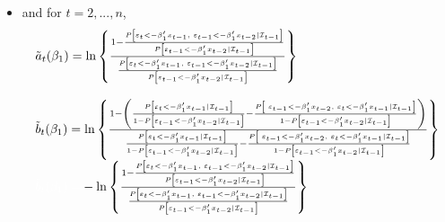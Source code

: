\documentclass{beamer}
\begin{document}
\begin{frame}
\begin{itemize}
\item{} and for $t=2,...,n$,%
\begin{equation*}
\begin{tabular}{l}
$\tilde{a}_{t}(\beta _{1})=\ln \left\{ \frac{1-\frac{P\left[
\varepsilon_{t}<-\beta_1'x_{t-1},\text{ }\varepsilon_{t-1}<-\beta _{1}'
x_{t-2}\mid\mathcal{I}_{t-1}\right] }{P\left[ \varepsilon_{t-1}<-\beta _{1}'
x_{t-2}\mid\mathcal{I}_{t-1}\right] }}{\frac{P\left[ \varepsilon_{t}<-\beta _{1}'
x_{t-1},\text{ }\varepsilon_{t-1}<-\beta_1'x_{t-2}\mid\mathcal{I}_{t-1}\right] }{P%
\left[ \varepsilon_{t-1}<-\beta_1'x_{t-2}\mid\mathcal{I}_{t-1}\right] }}\right\} $ \\ 
\\ 
$\tilde{b}_{t}(\beta _{1})=\ln \left\{ \frac{1-\left( \frac{P\left[
\varepsilon_{t}<-\beta_1'x_{t-1}\mid\mathcal{I}_{t-1}\right] }{1-P\left[
\varepsilon_{t-1}<-\beta_1'x_{t-2}\mid\mathcal{I}_{t-1}\right] }-\frac{P\left[ 
\text{ }\varepsilon_{t-1}<-\beta_1'x_{t-2},\text{ }\varepsilon_{t}<-\beta
_{1}'x_{t-1}\mid\mathcal{I}_{t-1}\right] }{1-P\left[ \varepsilon_{t-1}<-\beta
_{1}'x_{t-2}\mid\mathcal{I}_{t-1}\right] }\right) }{\frac{P\left[
\varepsilon_{t}<-\beta_1'x_{t-1}\mid\mathcal{I}_{t-1}\right] }{1-P\left[
\varepsilon_{t-1}<-\beta_1'x_{t-2}\mid\mathcal{I}_{t-1}\right] }-\frac{P\left[ 
\text{ }\varepsilon_{t-1}<-\beta_1'x_{t-2},\text{ }\varepsilon_{t}<-\beta
_{1}'x_{t-1}\mid\mathcal{I}_{t-1}\right] }{1-P\left[ \varepsilon_{t-1}<-\beta
_{1}'x_{t-2}\mid\mathcal{I}_{t-1}\right] }}\right\} $\\
$\textcolor{white}{\tilde{b}_{t}(\beta _{1})=}-\ln \left\{ \frac{1-\frac{%
P\left[ \varepsilon_{t}<-\beta_1'x_{t-1},\text{ }%
\varepsilon_{t-1}<-\beta_1'x_{t-2}\mid\mathcal{I}_{t-1}\right] }{P\left[
\varepsilon_{t-1}<-\beta_1'x_{t-2}\mid\mathcal{I}_{t-1}\right] }}{\frac{P\left[
\varepsilon_{t}<-\beta_1'x_{t-1},\text{ }\varepsilon_{t-1}<-\beta _{1}'
x_{t-2}\mid\mathcal{I}_{t-1}\right] }{P\left[ \varepsilon_{t-1}<-\beta _{1}'
x_{t-2}\mid\mathcal{I}_{t-1}\right] }}\right\} $%
\end{tabular}%
\end{equation*}%
\end{itemize}
\end{frame}
\end{document}
